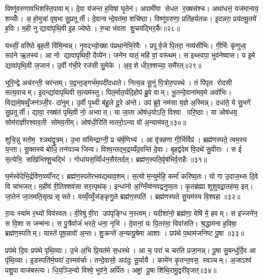 विष्णू॑वरुणावभिशस्ति॒पावाम्। दे॒वा य॑जन्त ह॒विषा॑ घृ॒तेन॑। अपामी॑वा सेधत र॒ख्षस॑श्च। अथा॑धत्तं॒ यज॑मानाय॒ शय्योँः। अ॒हो॒मुचा॑ वृष॒भा सु॒प्रतूर्ती। दे॒वानान्दे॒वत॑मा॒ शचि॑ष्ठा। विष्णू॑वरुणा॒ प्रति॑हर्यतन्नः। इ॒दन्नरा॒ प्रय॑तमू॒तये॑ ह॒विः। म॒ही नु द्यावा॑पृथि॒वी इ॒ह ज्येष्ठे। रु॒चा भ॑वता शु॒चय॑द्भिर॒र्कैः॥२८॥

यथ्सीं॒ वरि॑ष्ठे बृह॒ती वि॑मि॒न्वन्न्। नृ॒वद्भ्यो॒ख्षा प॑प्रथा॒नेभि॒रेवैः। प्रपूर्व॒जे पि॒तरा॒ नव्य॑सीभिः। गी॒र्भिः कृ॑णुध्व॒ सद॑ने ऋ॒तस्य॑। आ नो द्यावापृथिवी॒ दैव्ये॑न। जने॑न यातं॒ महि॑ वां॒ वरू॑थम्। स इथ्स्वपा॒ भुव॑नेष्वास। य इ॒मे द्यावा॑पृथि॒वी ज॒जान॑। उ॒र्वी ग॑भी॒रे रज॑सी सु॒मेके। अ॒व॒शे धीर॒श्शच्या॒ समै॑रत्॥२९॥

भूरि॒न्द्वे अच॑रन्ती॒ चर॑न्तम्। प॒द्वन्त॒ङ्गर्भ॑म॒पदी॑दधाते। नित्य॒न्न सू॒नुं पि॒त्रोरु॒पस्थे। तं पि॑पृत रोदसी सत्य॒वाचम्। इ॒दन्द्या॑वापृथिवी स॒त्यम॑स्तु। पित॒र्मात॒र्यदि॒होप॑ ब्रु॒वे वाम्। भू॒तन्दे॒वाना॑मव॒मे अवो॑भिः। विद्यामे॒षव्वृँ॒जन॑ञ्जी॒र- दा॑नुम्। उ॒र्वी पृ॒थ्वी ब॑हु॒ले दू॒रे अ॑न्ते। उप॑ ब्रुवे॒ नम॑सा य॒ज्ञे अ॒स्मिन्न्। दधा॑ते॒ ये सु॒भगे॑ सु॒प्रतूर्ती। द्यावा॒ रख्ष॑तं पृथि॒वी नो॒ अभ्वात्। या जा॒ता ओष॑ध॒योऽति॒ विश्वा परि॒ष्ठाः। या ओष॑धय॒ सोम॑राज्ञीरश्वाव॒ती सो॑मव॒तीम्। ओष॑धी॒रिति॑ मातरो॒ऽन्या वो॑ अ॒न्याम॑वतु॥३०॥\anuvakamend[ह॒विर्नो॑ दाद्भभूव रा॒तिं पू॒र्वहू॑ताव॒र्कैरै॑रद॒स्मिन्पञ्च॑ च]

शुचि॒न्नु स्तोम॒ श्ञथ॑द्वृ॒त्रम्। उ॒भा वा॑मिन्द्राग्नी॒ प्र च॑र्\mbox{}ष॒णिभ्य॑। आ वृ॑त्रहणा गी॒र्भिर्विप्र॑। ब्रह्म॑णस्पते॒ त्वम॒स्य य॒न्ता। सू॒क्तस्य॑ बोधि॒ तन॑यञ्च जिन्व। विश्व॒न्तद्भ॒द्रय्यँद॒वन्ति॑ दे॒वाः। बृ॒हद्व॑देम वि॒दथे॑ सु॒वीराः। स ई स॒त्येभि॒ सखि॑भिश्शु॒चद्भि॑। गोधा॑यस॒व्विँध॑न॒सैर॑तर्दत्। ब्रह्म॑ण॒स्पति॒र्वृष॑भिर्व॒राहैः॥३१॥

घ॒र्मस्वे॑देभि॒र्द्रवि॑ण॒व्व्याँ॑नट्। ब्रह्म॑ण॒स्पते॑रभवद्यथाव॒शम्। स॒त्यो म॒न्युर्महि॒ कर्मा॑ करिष्य॒तः। यो गा उ॒दाज॒थ्स दि॒वे वि चा॑भजत्। म॒हीव॑ री॒तिश्शव॑सा सर॒त्पृथ॑क्। इन्धा॑नो अ॒ग्निँव्व॑नवद्वनुष्य॒तः। कृ॒तब्र॑ह्मा शूशुवद्रा॒तह॑व्य॒ इत्। जा॒तेन॑ जा॒तमति॒सृत्प्र सृसते। यय्यँ॒य्युँज॑ङ्कृणु॒ते ब्रह्म॑ण॒स्पति॑। ब्रह्म॑णस्पते सु॒यम॑स्य वि॒श्वहा॥३२॥

रा॒यः स्या॑म र॒थ्यो॑ विव॑स्वतः। वी॒रेषु॑ वी॒रा उप॑पृङ्ग्धि न॒स्त्वम्। यदीशा॑नो॒ ब्रह्म॑णा॒ वेषि॑ मे॒ हवम्। स इज्जने॑न॒ स वि॒शा स जन्म॑ना। स पु॒त्रैर्वाजं॑ भरते॒ धना॒ नृभि॑। दे॒वानां॒ यः पि॒तर॑मा॒ विवा॑सति। श्र॒द्धाम॑ना ह॒विषा॒ ब्रह्म॑ण॒स्पतिम्। यास्ते॑ पूष॒न्नावो॑ अ॒न्तः। शु॒क्रन्ते॑ अ॒न्यत्पू॒षेमा आशाः। प्रप॑थे प॒थाम॑जनिष्ट पू॒षा ॥३३॥

प्रप॑थे दि॒वः प्रप॑थे पृथि॒व्याः। उ॒भे अ॒भि प्रि॒यत॑मे स॒धस्थे। आ च॒ परा॑ च चरति प्रजा॒नन्न्। पू॒षा सु॒बन्धु॑र्दि॒व आ पृ॑थि॒व्याः। इ॒डस्पति॑र्म॒घवा॑ द॒स्मव॑र्चाः। तन्दे॒वासो॒ अद॑दुः सू॒र्यायै। कामे॑न कृ॒तन्त॒वस॒ स्वञ्चम्। अ॒जाऽश्व॑ पशु॒पा वाज॑बस्त्यः। धि॒य॒ञ्जि॒न्वो विश्वे॒ भुव॑ने॒ अर्पि॑तः। अष्ट्रां पू॒षा शि॑थि॒रामु॒द्वरी॑वृजत्॥३४॥

